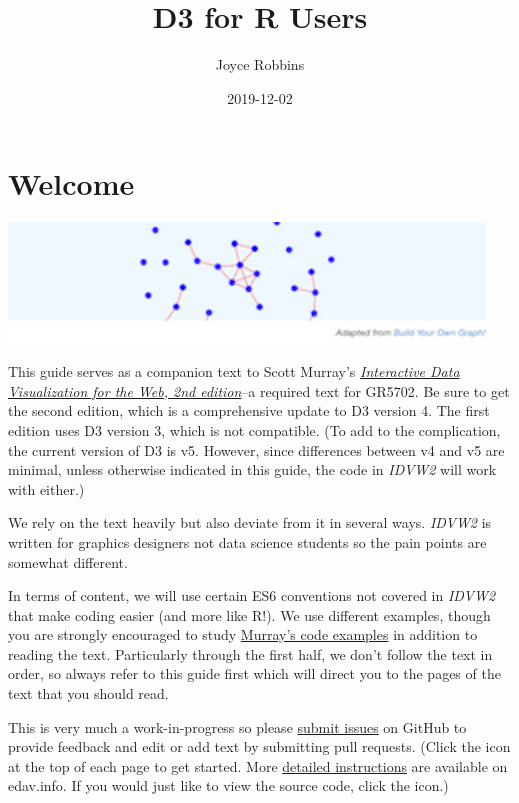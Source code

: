 \documentclass[openany]{book}
\title{D3 for R Users}
\author{Joyce Robbins}
\date{2019-12-02}
\begin{document}
\maketitle

{
\setcounter{tocdepth}{1}
\tableofcontents
}
\hypertarget{welcome}{%
\chapter*{Welcome}\label{welcome}}

\hypertarget{container}{}

\includegraphics[width=5in]{images/networkgraph}

This guide serves as a companion text to Scott Murray's \href{https://www.amazon.com/Interactive-Data-Visualization-Web-Introduction/dp/1491921285/}{\emph{Interactive Data Visualization for the Web, 2nd edition}}--a required text for GR5702. Be sure to get the second edition, which is a comprehensive update to D3 version 4. The first edition uses D3 version 3, which is not compatible. (To add to the complication, the current version of D3 is v5. However, since differences between v4 and v5 are minimal, unless otherwise indicated in this guide, the code in \emph{IDVW2} will work with either.)

We rely on the text heavily but also deviate from it in several ways. \emph{IDVW2} is written for graphics designers not data science students so the pain points are somewhat different.

In terms of content, we will use certain ES6 conventions not covered in \emph{IDVW2} that make coding easier (and more like R!). We use different examples, though you are strongly encouraged to study \href{https://github.com/alignedleft/d3-book/releases}{Murray's code examples} in addition to reading the text. Particularly through the first half, we don't follow the text in order, so always refer to this guide first which will direct you to the pages of the text that you should read.

This is very much a work-in-progress so please \href{https://github.com/jtr13/d3book/issues}{submit issues} on GitHub to provide feedback and edit or add text by submitting pull requests. (Click the icon at the top of each page to get started. More \href{https://edav.info/contribute.html\#step-2-click-the-edit-button}{detailed instructions} are available on edav.info. If you would just like to view the source code, click the icon.)
\end{document}
